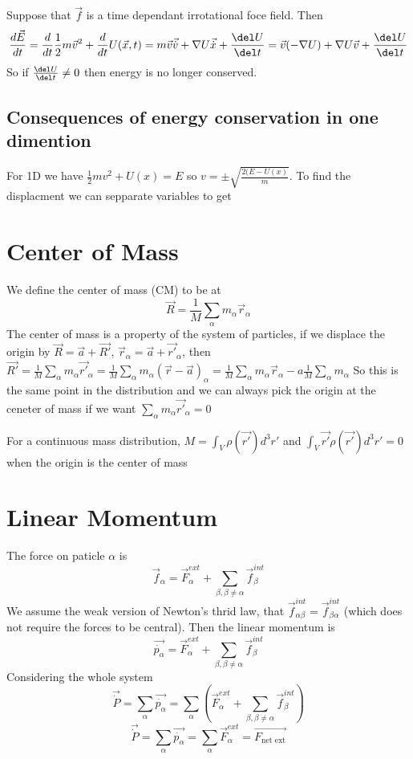 \documentclass{homework}
\begin{document}
Suppose that $\vec{f}$ is a time dependant irrotational foce field. Then
\[\frac{d\vec{E}}{dt} = \frac{d}{dt}\frac{1}{2}m\vec{v}^2 + \frac{d}{dt}U(\vec{x},t)  = m\vec{v}\vec{\dot{v}} + \nabla U \vec{\dot{x}} + \frac{\del U}{\del t} = \vec{v} (-\nabla U) + \nabla U \vec{v} + \frac{\del U}{\del t}\]
So if $\frac{\del U}{\del t} \neq 0$ then energy is no longer conserved.

\subsection{Consequences of energy conservation in one dimention}
For 1D we have $\frac{1}{2}mv^2 + U(x) = E$ so $v = \pm \sqrt{\frac{2(E-U(x)}{m}}$. To find the displacment we can sepparate variables to get





\section{Center of Mass}

We define the center of mass (CM) to be at
\[\vec{R} = \frac{1}{M}\sum_{\alpha}m_{\alpha}\vec{r}_{\alpha}\]
The center of mass is a property of the system of particles, if we displace the origin by $\vec{R} = \vec{a} + \vec{R'}$, $\vec{r}_{\alpha} = \vec{a} + \vec{r'}_{\alpha}$, then $\vec{R'} = \frac{1}{M}\sum_{\alpha}m_{\alpha}\vec{r'}_{\alpha} = \frac{1}{M}\sum_{\alpha}m_{\alpha}(\vec{r} - \vec{a})_{\alpha} = \frac{1}{M}\sum_{\alpha}m_{\alpha}\vec{r}_{\alpha} -a\frac{1}{M}\sum_{\alpha} m_{\alpha}$
So this is the same point in the distribution and we can always pick the origin at the ceneter of mass if we want $\sum_{\alpha}m_{\alpha}\vec{r'}_{\alpha} = 0$


For a continuous mass distribution, $M = \int_{V} \rho(\vec{r'})d^3r'$ and $ \int_{V} \vec{r'}\rho(\vec{r'})d^3r' = 0$ when the origin is the center of mass

\section{Linear Momentum}

The force on paticle $\alpha$ is 
\[\vec{f}_{\alpha} = \vec{F}_{\alpha}^{ext} + \sum_{\beta, \beta \neq \alpha}\vec{f}_{\beta}^{int}\]
We assume the weak version of Newton's thrid law, that $\vec{f}_{\alpha\beta}^{int} = \vec{f}_{\beta\alpha}^{int}$ (which does not require the forces to be central). Then the linear momentum is
\[\vec{\dot{p_{\alpha}}} = \vec{F}_{\alpha}^{ext} + \sum_{\beta, \beta \neq \alpha}\vec{f}_{\beta}^{int}\]
Considering the whole system
\[\vec{\dot{P}} = \sum_{\alpha} \vec{\dot{p_{\alpha}}} = \sum_{\alpha}(\vec{F}_{\alpha}^{ext} + \sum_{\beta, \beta \neq \alpha}\vec{f}_{\beta}^{int})\]
\[\vec{\dot{P}} = \sum_{\alpha} \vec{\dot{p_{\alpha}}} = \sum_{\alpha}\vec{F}_{\alpha}^{ext} = \vec{F_{\text{net ext}} }\]
\end{document}
